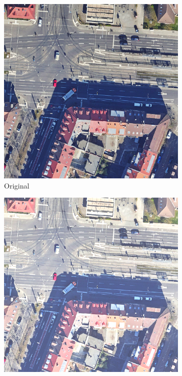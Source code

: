\begin{figure}
	\centering
	\begin{subfigure}{.32\textwidth}
		\centering
		\includegraphics[width=1.\linewidth]{Bilder/color_aug/149_karlsruhe.png}
		Original
	\end{subfigure}
	\begin{subfigure}{.32\textwidth}
		\centering
		\includegraphics[width=1.\linewidth]{Bilder/color_aug/RandomBrightness.png}

\end{subfigure}
\end{figure}
